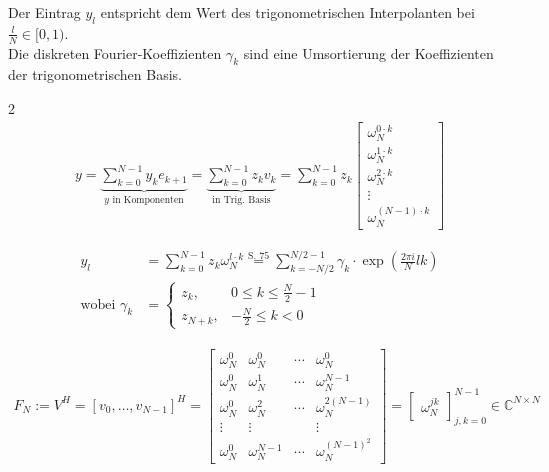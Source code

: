 Der Eintrag $y_l$ entspricht dem Wert des trigonometrischen Interpolanten bei $\frac{l}{N} \in [0,1)$. \\
Die diskreten Fourier-Koeffizienten $\gamma_k$ sind eine Umsortierung der Koeffizienten der trigonometrischen Basis.
\begin{multicols}{2}
    \begin{align*}
        y = \underbrace{\sum_{k=0}^{N-1} y_k e_{k+1}}_{y \text{ in Komponenten}} = \underbrace{\sum_{k=0}^{N-1} z_k v_k}_{\text{in Trig. Basis}} = \sum_{k=0}^{N-1} z_k
        \begin{bmatrix}
            \omega_N^{0 \cdot k} \\ \omega_N^{1 \cdot k} \\ \omega_N^{2 \cdot k} \\ \vdots \\ \omega_N^{(N-1) \cdot k}
        \end{bmatrix}
    \end{align*}
    \newcolumn

    \begin{align*}
        y_l                   & = \sum_{k=0}^{N-1} z_k \omega_N^{l \cdot k} \overset{\text{S. 75}}{=} \sum_{k=-N/2}^{N/2-1} \gamma_k \cdot \exp(\frac{2\pi i}{N}lk) \\
        \text{wobei }\gamma_k & =
        \begin{cases}
            z_k,   & 0 \leq k \leq \frac{N}{2}-1 \\
            z_{N+k}, & -\frac{N}{2} \leq k < 0
        \end{cases}
    \end{align*}
\end{multicols}

\begin{align*}
    F_N := V^H = [v_0, \ldots, v_{N-1}]^H =
    \begin{bmatrix}
        \omega_N^0 & \omega_N^0     & \cdots & \omega_N^0         \\
        \omega_N^0 & \omega_N^1     & \cdots & \omega_N^{N-1}     \\
        \omega_N^0 & \omega_N^2     & \cdots & \omega_N^{2(N-1)}  \\
        \vdots     & \vdots         &        & \vdots             \\
        \omega_N^0 & \omega_N^{N-1} & \cdots & \omega_N^{(N-1)^2}
    \end{bmatrix}
    =
    \begin{bmatrix}
        \omega_N^{jk}
    \end{bmatrix}^{N-1}_{j,k = 0}
    \in \mathbb{C}^{N\times N}
\end{align*}

